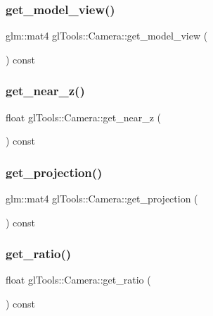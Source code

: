 \subsubsection{get\_model\_view()}
{\footnotesize\ttfamily glm\+::mat4 gl\+Tools\+::\+Camera\+::get\+\_\+model\+\_\+view (\begin{DoxyParamCaption}{ }\end{DoxyParamCaption}) const\hspace{0.3cm}{\ttfamily [inline]}}

\mbox{\label{classgl_tools_1_1_camera_a90be527017ebdd83e432d8f821cbf1b1}} 
\subsubsection{get\_near\_z()}
{\footnotesize\ttfamily float gl\+Tools\+::\+Camera\+::get\+\_\+near\+\_\+z (\begin{DoxyParamCaption}{ }\end{DoxyParamCaption}) const\hspace{0.3cm}{\ttfamily [inline]}}

\mbox{\label{classgl_tools_1_1_camera_ade0fce309eaabc2dc81f279809879d6a}} 
\subsubsection{get\_projection()}
{\footnotesize\ttfamily glm\+::mat4 gl\+Tools\+::\+Camera\+::get\+\_\+projection (\begin{DoxyParamCaption}{ }\end{DoxyParamCaption}) const\hspace{0.3cm}{\ttfamily [inline]}}

\mbox{\label{classgl_tools_1_1_camera_aa14e819566ca6761316b0a3c07894d54}} 
\subsubsection{get\_ratio()}
{\footnotesize\ttfamily float gl\+Tools\+::\+Camera\+::get\+\_\+ratio (\begin{DoxyParamCaption}{ }\end{DoxyParamCaption}) const\hspace{0.3cm}{\ttfamily [inline]}}

